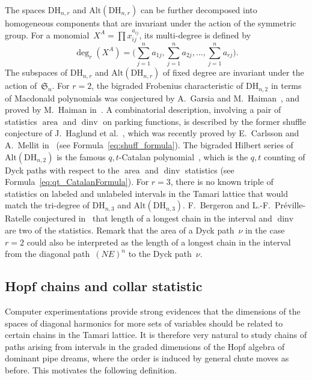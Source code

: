 \documentclass{amsart}
\theoremstyle{definition}
\newcommand{\fS}{\mathfrak{S}} %
\newcommand{\DiagHarm}[2]{\mathrm{DH}_{#1,#2}} %
\newcommand{\area}{\operatorname{area}} %
\newcommand{\dinv}{\operatorname{dinv}} %
\newcommand{\Alt}{\mathrm{Alt}} %
\begin{document}
The spaces $\DiagHarm{n}{r}$ and $\Alt(\DiagHarm{n}{r})$ can be further decomposed into homogeneous components that are invariant under the action of the symmetric group.
For a monomial~$X^A=\prod x_{ij}^{a_{ij}}$, its multi-degree is defined by
\[
\deg_{r}(X^A) = \Big( \sum_{j=1}^n a_{1j}, \sum_{j=1}^n a_{2j}, \dots, \sum_{j=1}^n a_{rj} \Big).
\]
The subspaces of $\DiagHarm{n}{r}$ and $\Alt(\DiagHarm{n}{r})$ of fixed degree are invariant under the action of~$\fS_n$.
For $r=2$, the bigraded Frobenius characteristic of $\DiagHarm{n}{2}$ in terms of Macdonald polynomials was conjectured by A.~Garsia and M.~Haiman~\cite{GarsiaHaiman-remarkableCatalanSequence}, and proved by M.~Haiman in~\cite{Haiman-vanishingTheorems}.
A combinatorial description, involving a pair of statistics $\area$ and $\dinv$ on parking functions, is described by the former shuffle conjecture of J.~Haglund et al.~\cite{HaglundHaimanLoehrRemmelUlyanov}, which was recently proved by E.~Carlsson and A.~Mellit in~\cite{CarlssonMellit} (see Formula~\eqref{eq:shuff_formula}). 
The bigraded Hilbert series of~$\Alt(\DiagHarm{n}{2})$ is the famous $q,t$-Catalan polynomial~\cite{Haglund-qt-catalan}, which is the $q,t$ counting of Dyck paths with respect to the $\area$ and $\dinv$ statistics (see Formula~\ref{eq:qt_CatalanFormula}).
For $r=3$, there is no known triple of statistics on labeled and unlabeled intervals in the Tamari lattice that would match the tri-degree of $\DiagHarm{n}{3}$ and $\Alt(\DiagHarm{n}{3})$.
F.~Bergeron and L.-F.~Pr\'eville-Ratelle conjectured in~\cite[Conj.~1]{BergeronPrevilleRatelle} that length of a longest chain in the interval and $\dinv$ are two of the statistics.
Remark that the area of a Dyck path~$\nu$ in the case~$r=2$ could also be interpreted as the length of a longest chain in the interval from the diagonal path~$(NE)^n$ to the Dyck path~$\nu$.


\subsection{Hopf chains and collar statistic}
\label{subsec:HopfChains}

Computer experimentations provide strong evidences that the dimensions of the spaces of diagonal harmonics for more sets of variables should be related to certain chains in the Tamari lattice. It is therefore very natural to study chains of paths arising from intervals in the graded dimensions of the Hopf algebra of dominant pipe dreams, where the order is induced by general chute moves as before. This motivates the following definition.
\end{document}

